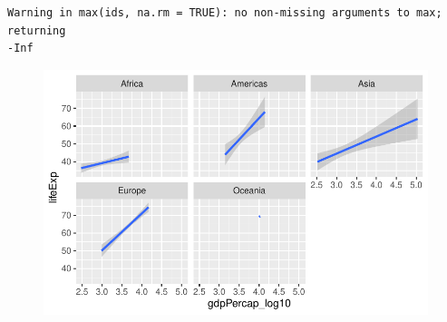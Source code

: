 \documentclass[
  letterpaper,
  DIV=11,
  numbers=noendperiod]{scrartcl}
\begin{document}
\begin{verbatim}
Warning in max(ids, na.rm = TRUE): no non-missing arguments to max; returning
-Inf
\end{verbatim}

\begin{figure}[H]

{\centering \includegraphics{LinearRegression_files/figure-pdf/unnamed-chunk-21-1.pdf}

}

\end{figure}
\end{document}
